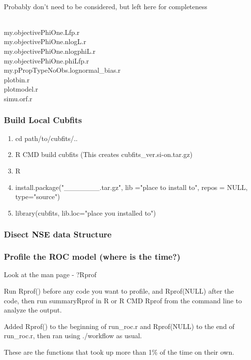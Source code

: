 ~


Probably don't need to be considered, but left here for completeness

~\\
my.objectivePhiOne.Lfp.r\\
my.objectivePhiOne.nlogL.r\\
my.objectivePhiOne.nlogphiL.r\\
my.objectivePhiOne.phiLfp.r\\
my.pPropTypeNoObs.lognormal\_bias.r\\
plotbin.r\\
plotmodel.r\\
simu.orf.r\\


\subsubsection{Build Local Cubfits}

\begin{enumerate}
\item cd path/to/cubfits/..
\item R CMD build cubfits (This creates cubfits\_ver.si-on.tar.gz)
\item R
\item install.package("\_\_\_\_\_\_\_.tar.gz", lib ="place to install to", repos = NULL, type="source")
\item library(cubfits, lib.loc="place you installed to")
\end{enumerate}


\subsubsection{Disect NSE data Structure}

\subsubsection{Profile the ROC model (where is the time?)}
Look at the man page - ?Rprof 

Run Rprof() before any code you want to profile, and Rprof(NULL) after the code, then run summaryRprof in R or R CMD Rprof from the command line to analyze the output. 

Added Rprof() to the beginning of run\_roc.r and Rprof(NULL) to the end of run\_roc.r, then ran using ./workflow as usual.

These are the functions that took up more than 1\% of the time on their own.


